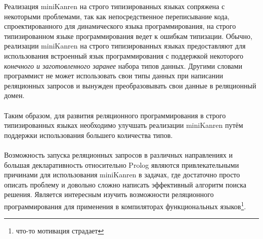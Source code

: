 Реализация miniKanren на строго типизированных языках сопряжена с некоторыми проблемами, так как непосредственное переписывание кода, спроектированного для динамического языка программирования, на строго типизированном языке программирования ведет к ошибкам типизации. Обычно, реализации miniKanren на строго типизированных языках предоставляют для использования встроенный язык программирования с поддержкой некоторого \emph{конечного и заготовленного заранее} набора типов данных. Другими словами программист не может использовать свои типы данных при написании реляционных запросов и вынужден преобразовывать свои данные в реляционный домен.

\paragraph{} Таким образом, для развития реляционного программирования в строго типизированных языках необходимо улучшать реализации miniKanren путём поддержки использования большего количества типов. 

\paragraph{} Возможность запуска реляционных запросов в различных направлениях и большая декларативность относительно Prolog являются привлекательными причинами для использования miniKanren в задачах, где достаточно просто описать проблему и довольно сложно написать эффективный алгоритм поиска решения. Является интересным изучить возможности реляционного программирования для применения в компиляторах функциональных языков\footnote{что-то мотивация страдает}.


